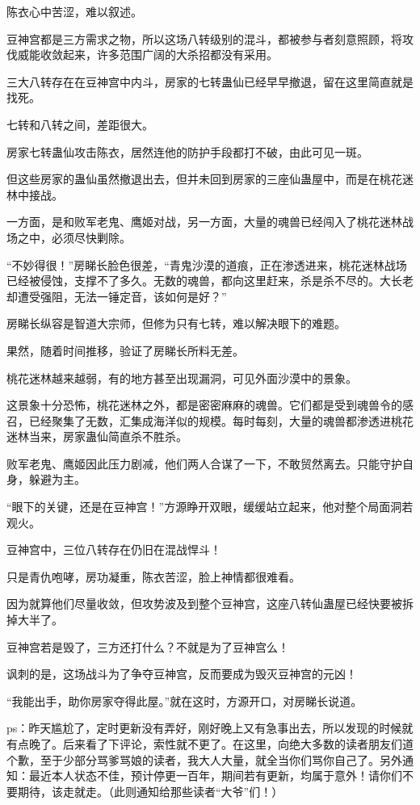 \begin{this_body}
陈衣心中苦涩，难以叙述。

豆神宫都是三方需求之物，所以这场八转级别的混斗，都被参与者刻意照顾，将攻伐威能收敛起来，许多范围广阔的大杀招都没有采用。

三大八转存在在豆神宫中内斗，房家的七转蛊仙已经早早撤退，留在这里简直就是找死。

七转和八转之间，差距很大。

房家七转蛊仙攻击陈衣，居然连他的防护手段都打不破，由此可见一斑。

但这些房家的蛊仙虽然撤退出去，但并未回到房家的三座仙蛊屋中，而是在桃花迷林中接战。

一方面，是和败军老鬼、鹰姬对战，另一方面，大量的魂兽已经闯入了桃花迷林战场之中，必须尽快剿除。

“不妙得很！”房睇长脸色很差，“青鬼沙漠的道痕，正在渗透进来，桃花迷林战场已经被侵蚀，支撑不了多久。无数的魂兽，都向这里赶来，杀是杀不尽的。大长老却遭受强阻，无法一锤定音，该如何是好？”

房睇长纵容是智道大宗师，但修为只有七转，难以解决眼下的难题。

果然，随着时间推移，验证了房睇长所料无差。

桃花迷林越来越弱，有的地方甚至出现漏洞，可见外面沙漠中的景象。

这景象十分恐怖，桃花迷林之外，都是密密麻麻的魂兽。它们都是受到魂兽令的感召，已经聚集了无数，汇集成海洋似的规模。每时每刻，大量的魂兽都渗透进桃花迷林当来，房家蛊仙简直杀不胜杀。

败军老鬼、鹰姬因此压力剧减，他们两人合谋了一下，不敢贸然离去。只能守护自身，躲避为主。

“眼下的关键，还是在豆神宫！”方源睁开双眼，缓缓站立起来，他对整个局面洞若观火。

豆神宫中，三位八转存在仍旧在混战悍斗！

只是青仇咆哮，房功凝重，陈衣苦涩，脸上神情都很难看。

因为就算他们尽量收敛，但攻势波及到整个豆神宫，这座八转仙蛊屋已经快要被拆掉大半了。

豆神宫若是毁了，三方还打什么？不就是为了豆神宫么！

讽刺的是，这场战斗为了争夺豆神宫，反而要成为毁灭豆神宫的元凶！

“我能出手，助你房家夺得此屋。”就在这时，方源开口，对房睇长说道。

ps：昨天尴尬了，定时更新没有弄好，刚好晚上又有急事出去，所以发现的时候就有点晚了。后来看了下评论，索性就不更了。在这里，向绝大多数的读者朋友们道个歉，至于少部分骂爹骂娘的读者，我大人大量，就全当你们骂你自己了。另外通知：最近本人状态不佳，预计停更一百年，期间若有更新，均属于意外！请你们不要期待，该走就走。（此则通知给那些读者“大爷”们！）

\end{this_body}

